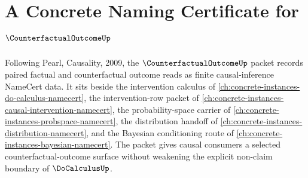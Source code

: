 \chapter{A Concrete Naming Certificate for $\CounterfactualOutcomeUp$}
\label{ch:concrete-instances-counterfactual-outcome-namecert}

Following Pearl, Causality, 2009, the $\CounterfactualOutcomeUp$ packet records paired factual and counterfactual outcome reads as finite causal-inference NameCert data. It sits beside the intervention calculus of \autoref{ch:concrete-instances-do-calculus-namecert}, the intervention-row packet of \autoref{ch:concrete-instances-causal-intervention-namecert}, the probability-space carrier of \autoref{ch:concrete-instances-probspace-namecert}, the distribution handoff of \autoref{ch:concrete-instances-distribution-namecert}, and the Bayesian conditioning route of \autoref{ch:concrete-instances-bayesian-namecert}. The packet gives causal consumers a selected counterfactual-outcome surface without weakening the explicit non-claim boundary of $\DoCalculusUp$.

